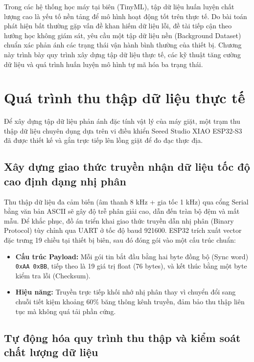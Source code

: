 \label{chuong_3}

Trong các hệ thống học máy tại biên (TinyML), tập dữ liệu huấn luyện chất lượng cao là yếu tố nền tảng để mô hình hoạt động tốt trên thực tế. Do bài toán phát hiện bất thường gặp vấn đề khan hiếm dữ liệu lỗi, đề tài tiếp cận theo hướng học không giám sát, yêu cầu một tập dữ liệu nền (Background Dataset) chuẩn xác phản ánh các trạng thái vận hành bình thường của thiết bị. Chương này trình bày quy trình xây dựng tập dữ liệu thực tế, các kỹ thuật tăng cường dữ liệu và quá trình huấn luyện mô hình tự mã hóa ba trạng thái.

\section{Quá trình thu thập dữ liệu thực tế}

Để xây dựng tập dữ liệu phản ánh đặc tính vật lý của máy giặt, một trạm thu thập dữ liệu chuyên dụng dựa trên vi điều khiển Seeed Studio XIAO ESP32-S3 đã được thiết kế và gắn trực tiếp lên lồng giặt để đo đạc thực địa.

\subsection{Xây dựng giao thức truyền nhận dữ liệu tốc độ cao định dạng nhị phân}

Thu thập dữ liệu đa cảm biến (âm thanh 8 kHz + gia tốc 1 kHz) qua cổng Serial bằng văn bản ASCII sẽ gây độ trễ phân giải cao, dẫn đến tràn bộ đệm và mất mẫu. Để khắc phục, đồ án triển khai giao thức truyền dẫn nhị phân (Binary Protocol) tùy chỉnh qua UART ở tốc độ baud 921600. ESP32 trích xuất vector đặc trưng 19 chiều tại thiết bị biên, sau đó đóng gói vào một cấu trúc chuẩn:

\begin{itemize}
    \item \textbf{Cấu trúc Payload:} Mỗi gói tin bắt đầu bằng hai byte đồng bộ (Sync word) \texttt{0xAA 0xBB}, tiếp theo là 19 giá trị float (76 bytes), và kết thúc bằng một byte kiểm tra lỗi (Checksum).
    \item \textbf{Hiệu năng:} Truyền trực tiếp khối nhớ nhị phân thay vì chuyển đổi sang chuỗi tiết kiệm khoảng 60\% băng thông kênh truyền, đảm bảo thu thập liên tục mà không quá tải phần cứng.
\end{itemize}

\subsection{Tự động hóa quy trình thu thập và kiểm soát chất lượng dữ liệu}

